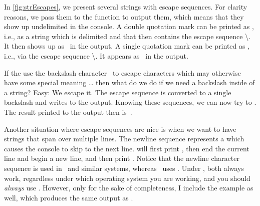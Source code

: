 In \cref{fig:strEscapes}, we present several strings with escape sequences.
For clarity reasons, we pass them to the  function to output them, which means that they show up undelimited in the console.
A double quotation mark can be printed as , i.e., as a string which is delimited and that then contains the escape sequence {\textbackslash\textquotedbl}\pythonIdx{\textbackslash\textquotedbl}.
It then shows up as~ in the output.
A single quotation mark can be printed as , i.e., via the escape sequence {\textbackslash\textquotesingle}\pythonIdx{\textbackslash\textquotesingle}.
It appears as~ in the output.

If the use the backslash character~\inQuotes{\textbackslash}\pythonIdx{\textbackslash} to escape characters which may otherwise have some special meaning {\dots} then what do we do if we need a backslash inside of a string?
Easy: We escape it.
The escape sequence \inQuotes{\textbackslash\textbackslash}\pythonIdx{\textbackslash\textbackslash} is converted to a single backslash and \expandafter{} writes \inlinelistingbox{\texttt{\\}} to the output.
Knowing these sequences, we can now try to .
The result printed to the output then is~.

Another situation where escape sequences are nice is when we want to have strings that span over multiple lines.
The newline sequence  represents a  which causes the console to skip to the next line.
 will first print , then end the current line and begin a new line, and then print .
Notice that the newline character sequence  is used in \linux\ and similar systems, whereas \windows\ uses .
Under \python, both always work, regardless under which operating system you are working, and you should \emph{always} use .
However, only for the sake of completeness, I include the example  as well, which produces the same output as .

